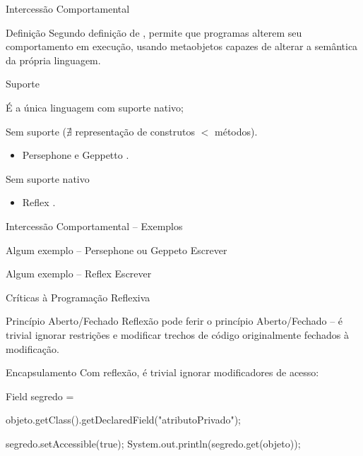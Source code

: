 \documentclass[12pt,t]{beamer}
\begin{document}
 	 \begin{frame}{Intercessão Comportamental}
 	 	\begin{block}{Definição}
 	 		Segundo definição de , permite que programas alterem seu comportamento em execução, usando metaobjetos capazes de alterar a semântica da própria linguagem.
 	 	\end{block} 	 	 	 	
 		\begin{block}{Suporte}
 			\begin{description}  [Smalltalk:] 
	 			\item [CLOS] É a única linguagem com suporte nativo;
	 			\item [Smalltalk:] Sem suporte ($\nexists$ representação de construtos $<$ métodos). 
	 			\begin{itemize}
	 				\item Persephone e Geppetto \cite{marschall2006taking,rothlisberger2006geppetto}.
	 			\end{itemize}
	 			\item [Java:] Sem suporte nativo
	 			\begin{itemize}
	 				\item Reflex \cite{tanter2001reflex}.
	 			\end{itemize}
	 		\end{description}
 	 	\end{block} 	 	 	 	
 	 \end{frame}
 	 \begin{frame}{Intercessão Comportamental -- Exemplos}
 	 	\begin{exampleblock}{Algum exemplo -- Persephone ou Geppeto}
 	 		\alert{Escrever}
 	 	\end{exampleblock}
 	 	\begin{exampleblock}{Algum exemplo -- Reflex}
 	 		\alert{Escrever}
 	 	\end{exampleblock}
 	 \end{frame} 	 
 	 \begin{frame}{Críticas à Programação Reflexiva}
 	 	\begin{block}{Princípio Aberto/Fechado}
 	 		Reflexão pode ferir o princípio Aberto/Fechado \cite{meyer1988object} -- é trivial ignorar restrições e modificar trechos de código originalmente fechados à modificação.
 	 	\end{block}
 	 	\begin{block}{Encapsulamento}
 	 		Com reflexão, é trivial ignorar modificadores de acesso:
 	 		\begin{adjustwidth}{2.5em}{0pt}
 	 			Field segredo = \\
 	 			\begin{adjustwidth}{2.5em}{0pt}
 	 				objeto.getClass().getDeclaredField("atributoPrivado");
 	 			\end{adjustwidth}
				segredo.setAccessible(true);
				System.out.println(segredo.get(objeto));
			\end{adjustwidth}
 	 	\end{block}
 	 \end{frame}
\end{document}
